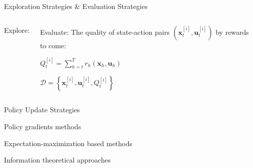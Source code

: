 \documentclass[10pt]{beamer}
\begin{document}
\begin{frame}{Exploration Strategies \& Evaluation Strategies}
\begin{columns}[T,onlytextwidth]
\begin{alertblock}{Explore:}
        \end{alertblock}

        \begin{exampleblock}{Evaluate:}
        The quality of state-action pairs $(\bm{x}_t^{[i]}, \bm{u}_t^{[i]})$ by rewards to come: 
        
        $Q^{[i]}_t = \sum_{h=t}^T { r_h({\bm{x}}_h, {\bm{u}}_h) }$

        $\mathcal{D} = \left\{ \bm{x}_t^{[i]}, \bm{u}_t^{[i]}, Q_t^{[i]} \right\}$
        \end{exampleblock}

\end{columns}

\end{frame}



\begin{frame}{Policy Update Strategies}

\begin{alertblock}{Policy gradients methods}
\end{alertblock}
\vspace{3em}
\begin{alertblock}{Expectation-maximization based methods}
\end{alertblock}
\vspace{3em}
\begin{alertblock}{Information theoretical approaches}
\end{alertblock}

\end{frame}
\end{document}
